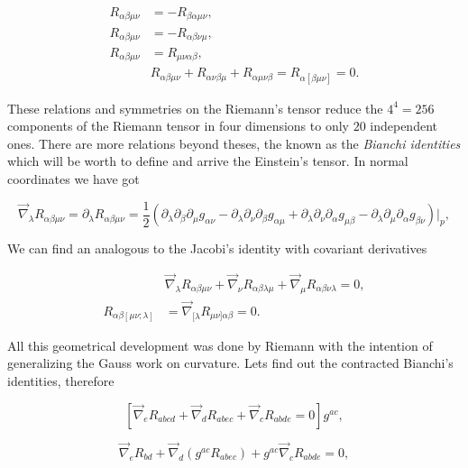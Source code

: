 \begin{align}
    R_{\alpha\beta\mu\nu}&=-R_{\beta\alpha\mu\nu},\\
    R_{\alpha\beta\mu\nu}&=-R_{\alpha\beta\nu\mu},\\
    R_{\alpha\beta\mu\nu}&=R_{\mu\nu\alpha\beta},\\
    &R_{\alpha\beta\mu\nu}+R_{\alpha\nu\beta\mu}+R_{\alpha\mu\nu\beta} = R_{\alpha[\beta\mu\nu]}=0.
\end{align}

These relations and symmetries on the Riemann's tensor reduce the $4^4 = 256$ components of the Riemann tensor in four dimensions to only $20$ independent ones. There are more relations beyond theses, the known as the \textit{Bianchi identities} which will be worth to define and arrive the Einstein's tensor. In normal coordinates we have got

\begin{equation}
    \Vec{\nabla}_{\lambda}R_{\alpha\beta\mu\nu}=\partial_{\lambda}R_{\alpha\beta
    \mu\nu}= \frac{1}{2}\left(\partial_{\lambda}\partial_{\beta}\partial_{\mu}g_{\alpha\nu}  - \partial_{\lambda}\partial_{\nu}\partial_{\beta}g_{\alpha\mu} + \partial_{\lambda}\partial_{\nu}\partial_{\alpha}g_{\mu\beta} - \partial_{\lambda}\partial_{\mu}\partial_{\alpha}g_{\beta\nu}\right)|_p,
\end{equation}

We can find an analogous to the Jacobi's identity with covariant derivatives

\begin{align}
    &\Vec{\nabla}_{\lambda}R_{\alpha\beta\mu\nu} + \Vec{\nabla}_{\nu}R_{\alpha\beta\lambda\mu} + \Vec{\nabla}_{\mu}R_{\alpha\beta\nu\lambda}=0,\\
    R_{\alpha\beta\left[\mu\nu;\lambda \right]} &= \Vec{\nabla}_{[\lambda}R_{\mu\nu]\alpha\beta}=0.
\end{align}

All this geometrical development was done by Riemann with the intention of generalizing the Gauss work on curvature. Lets find out the contracted Bianchi's identities, therefore

\begin{equation}
    \left[\Vec{\nabla}_eR_{abcd} + \Vec{\nabla}_dR_{abec} + \Vec{\nabla}_cR_{abde} = 0 \right]g^{ac},
\end{equation}

\begin{equation}
    \Vec{\nabla}_eR_{bd} + \Vec{\nabla}_d\left(g^{ac}R_{abec} \right) + g^{ac}\Vec{\nabla}_cR_{abde}=0,
\end{equation}

